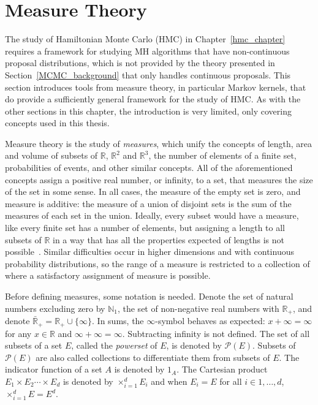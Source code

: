 \documentclass[english,twoside,openright]{HYgraduMLDS}
\newcommand{\R}{\mathbb{R}}
\newcommand{\N}{\mathbb{N}}
\DeclareMathOperator*{\bigtimes}{\times}
\begin{document}
\section{Measure Theory}\label{measure_theory_section}

The study of Hamiltonian Monte Carlo (HMC) in Chapter~\ref{hmc_chapter}
requires a framework for studying MH algorithms
that have non-continuous proposal distributions, which is not provided
by the theory presented in Section~\ref{MCMC_background} that only handles
continuous proposals.
This section introduces tools from measure theory, in particular
Markov kernels, that do provide a sufficiently general
framework for the study of HMC. As with the other sections in this chapter,
the introduction is very limited, only covering concepts used in this thesis.

Measure theory is the study of \emph{measures}, which unify the concepts
of length, area and volume of subsets of \(\R\), \(\R^{2}\) and
\(\R^{3}\), the number of elements of a finite set, probabilities of events,
and other similar
concepts. All of the aforementioned concepts assign a positive real number,
or infinity, to a set, that measures the size of the set in some sense.
In all cases, the measure of the empty set is zero, and measure is
additive: the measure of a union of disjoint sets is the sum of the measures
of each set in the union. Ideally, every subset would have a measure, like
every finite set has a number of elements, but assigning a
length to all subsets of \(\R\) in a way that has all the properties expected
of lengths
is not possible~\cite{Cin11}. Similar difficulties occur in higher dimensions and with
continuous probability distributions, so the range of a measure is
restricted to a collection of where a satisfactory assignment of measure is
possible.

Before defining measures, some notation is needed. Denote the set of
natural numbers excluding zero by \(\N_{1}\), the set of
non-negative real numbers with \(\R_{+}\), and denote
\(\bar{\R}_{+} = \R_{+}\cup \{\infty\}\). In sums, the \(\infty\)-symbol
behaves as expected: \(x + \infty = \infty\) for any \(x\in \R\) and
\(\infty + \infty = \infty\). Subtracting infinity is not defined.
The set of all subsets of a set \(E\), called
the \emph{powerset} of \(E\), is denoted by \(\mathcal{P}(E)\).
Subsets of \(\mathcal{P}(E)\) are also called collections to
differentiate them from subsets of \(E\).
The indicator function of a set \(A\) is denoted by \(1_{A}\).
The Cartesian product \(E_{1}\times E_{2}\dotsb \times E_{d}\)
is denoted by \(\bigtimes_{i=1}^{d}E_{i}\) and when \(E_{i} = E\) for
all \(i\in 1,\dotsc,d\), \(\bigtimes_{i=1}^{d}E = E^{d}\).
\end{document}
